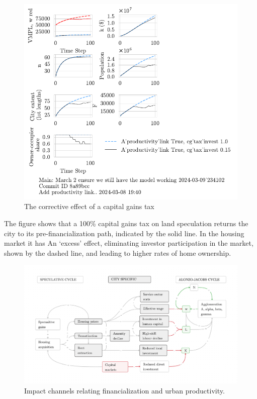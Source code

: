 \begin{figure}[h!tb]\label{fig-Productivity_link_and_CG}
    \centering
    \includegraphics[scale=1, trim=.25cm 2cm .25cm .25cm, clip]{fig/Productivity_link_and_CG.pdf}
    \caption{The corrective effect of a capital gains tax}
    \label{fig:Productivity_link_and_CG}
\end{figure}

The figure shows that a 100\% capital gains tax on land speculation returns the city to its pre-financialization path, indicated by the solid line. In the housing market it has An `excess' effect, eliminating investor participation in the market, shown by the dashed line, and leading to higher rates of home ownership. 

\begin{figure}[h!tb]\label{fig-impact-channels}
\begin{adjustwidth}{-0.24\textwidth}{-0.24\textwidth}
\centering
\includegraphics[scale=.15 ]{fig/impact-channels.png}%
\end{adjustwidth}
\caption{Impact channels relating financialization and urban productivity.}
\end{figure}
 
